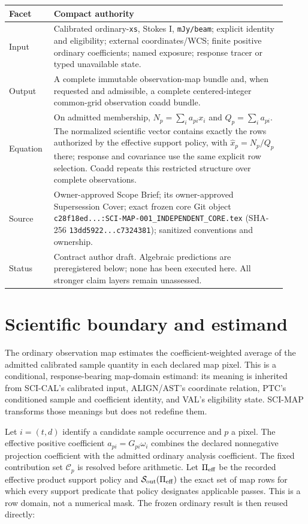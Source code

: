 \documentclass[10pt]{article}
\newcommand{\code}[1]{\nolinkurl{#1}}
\begin{document}
\begin{longtable}{L{0.14\linewidth}L{0.78\linewidth}}
\toprule
Facet & Compact authority\\
\midrule
Input & Calibrated ordinary-\code{xs}, Stokes I, \code{mJy/beam}; explicit
identity and eligibility; external coordinates/WCS; finite positive ordinary
coefficients; named exposure; response tracer or typed unavailable state.\\
Output & A complete immutable observation-map bundle and, when requested and
admissible, a complete centered-integer common-grid observation coadd bundle.\\
Equation & On admitted membership, \(N_p=\sum_i a_{pi}x_i\) and
\(Q_p=\sum_i a_{pi}\). The normalized scientific vector contains exactly the
rows authorized by the effective support policy, with
\(\widehat x_p=N_p/Q_p\) there; response and covariance use the same explicit
row selection. Coadd repeats this restricted structure over complete
observations.\\
Source & Owner-approved Scope Brief; its owner-approved Supersession Cover;
exact frozen core Git object \code{c28f18ed...:SCI-MAP-001_INDEPENDENT_CORE.tex}
(SHA-256 \code{13dd5922...c7324381}); sanitized conventions and ownership.\\
Status & Contract author draft. Algebraic predictions are preregistered below;
none has been executed here. All stronger claim layers remain unassessed.\\
\bottomrule
\end{longtable}

\tableofcontents

\clearpage
\section{Scientific boundary and estimand}

The ordinary observation map estimates the coefficient-weighted average of
the admitted calibrated sample quantity in each declared map pixel. This is a
conditional, response-bearing map-domain estimand: its meaning is inherited
from SCI-CAL's calibrated input, ALIGN/AST's coordinate relation, PTC's
conditioned sample and coefficient identity, and VAL's eligibility state.
SCI-MAP transforms those meanings but does not redefine them.

Let \(i=(t,d)\) identify a candidate sample occurrence and \(p\) a pixel.
The effective positive coefficient \(a_{pi}=G_{pi}\omega_i\) combines the
declared nonnegative projection coefficient with the admitted ordinary
analysis coefficient. The fixed contribution set \(\mathcal C_p\) is resolved
before arithmetic. Let \(\Pi_{\rm eff}\) be the recorded effective product
support policy and \(\mathcal S_{\rm out}(\Pi_{\rm eff})\) the exact set of map
rows for which every support predicate that policy designates applicable
passes. This is a row domain, not a numerical mask. The frozen ordinary result
is then reused directly:
\end{document}

